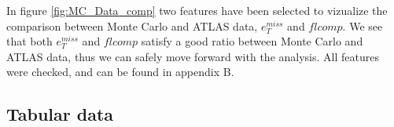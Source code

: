 In figure \ref{fig:MC_Data_comp} two features have been selected to vizualize the comparison between Monte Carlo and ATLAS data, $e_T^{miss}$ and $flcomp$. 
We see that both $e_T^{miss}$ and $flcomp$ satisfy a good ratio between Monte Carlo and ATLAS data, thus we can safely move forward with the analysis. 
All features were checked, and can be found in appendix B.
\par \par

\subsection*{Tabular data}